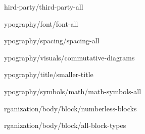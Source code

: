 
\def\loadOption #1{}

\loadOption third-party/third-party-all

\loadOption typography/font/font-all

\loadOption typography/spacing/spacing-all

\loadOption typography/visuals/commutative-diagrams

\loadOption typography/title/smaller-title

\loadOption typography/symbols/math/math-symbols-all

\loadOption organization/body/block/numberless-blocks

\loadOption organization/body/block/all-block-types
